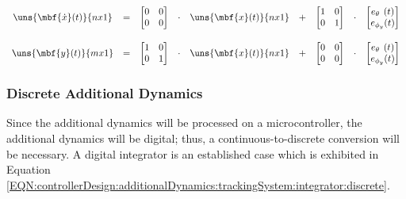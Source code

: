\documentclass[crop=false,float=true,class=scrreprt]{standalone}
\begin{document}
\begin{equation}
\label{EQN:controllerDesign:additionalDynamics:trackingSystem:integrator:analog}
\begin{array}{ccccccccc}
\uns{\mbf{\dot{x}}(t)}{n x 1}
& = &
\begin{bmatrix}
0 & 0 \\
0 & 0 \\
\end{bmatrix}
& \cdot &
\uns{\mbf{x}(t)}{n x 1} 
& + & 
\begin{bmatrix}
1 & 0 \\
0 & 1 \\
\end{bmatrix}
& \cdot &
\begin{bmatrix}
e_{\theta_{\hphantom{y}}} (t) \\
e_{\phi_{y}}              (t) \\
\end{bmatrix}
\\[+2em]
\uns{\mbf{y}(t)}{m x 1}
& = &
\begin{bmatrix}
1 & 0 \\
0 & 1 \\
\end{bmatrix}
& \cdot &
\uns{\mbf{x}(t)}{n x 1}
& + &
\begin{bmatrix}
0 & 0 \\
0 & 0 \\
\end{bmatrix}
& \cdot &
\begin{bmatrix}
e_{\theta_{\hphantom{y}}} (t) \\
e_{\phi_{y}}              (t) \\
\end{bmatrix}
\end{array}
\end{equation}




\clearpage




\subsubsection{Discrete Additional Dynamics}


Since the additional dynamics will be processed on a microcontroller,
the additional dynamics will be digital;
thus, a continuous-to-discrete conversion will be necessary.
A digital integrator is an established case which is exhibited in Equation~%
\eqref{EQN:controllerDesign:additionalDynamics:trackingSystem:integrator:discrete}.
\end{document}
